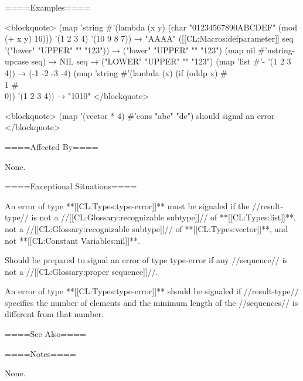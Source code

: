 ====Examples====

<blockquote> (map 'string #'(lambda (x y) (char "01234567890ABCDEF" (mod (+ x y) 16))) '(1 2 3 4) '(10 9 8 7)) → "AAAA" ([[CL:Macros:defparameter]] seq '("lower" "UPPER" "" "123")) → ("lower" "UPPER" "" "123") (map nil #'nstring-upcase seq) → NIL seq → ("LOWER" "UPPER" "" "123") (map 'list #'- '(1 2 3 4)) → (-1 -2 -3 -4) (map 'string #'(lambda (x) (if (oddp x) #\\1 #\\0)) '(1 2 3 4)) → "1010" </blockquote>

<blockquote> (map '(vector * 4) #'cons "abc" "de") should signal an error </blockquote>

====Affected By====

None.

====Exceptional Situations====

An error of type **[[CL:Types:type-error]]** must be signaled if the //result-type// is not a //[[CL:Glossary:recognizable subtype]]// of **[[CL:Types:list]]**, not a //[[CL:Glossary:recognizable subtype]]// of **[[CL:Types:vector]]**, and not **[[CL:Constant Variables:nil]]**.

Should be prepared to signal an error of type type-error if any //sequence// is not a //[[CL:Glossary:proper sequence]]//.

An error of type **[[CL:Types:type-error]]** should be signaled if //result-type// specifies the number of elements and the minimum length of the //sequences// is different from that number.

====See Also====

{\secref\TraversalRules}

====Notes====

None.

      
